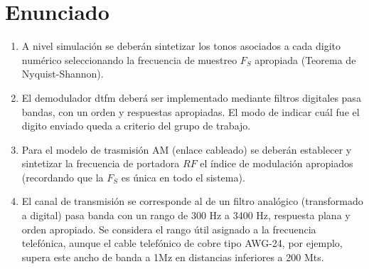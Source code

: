 \section{Enunciado}
\begin{enumerate}[label=\alph*)]
  \item A nivel simulación se deberán sintetizar
        los tonos asociados a cada digito
        numérico seleccionando la frecuencia
        de muestreo $F_S$ apropiada (Teorema de Nyquist-Shannon).
  \item El demodulador \gls{dtfm} deberá ser
        implementado mediante filtros
        digitales pasa bandas, con un
        orden y respuestas apropiadas. El
        modo de indicar cuál fue el digito
        enviado queda a criterio del grupo
        de trabajo.
  \item Para el modelo de trasmisión AM
        (enlace cableado) se deberán
        establecer y sintetizar la frecuencia
        de portadora $RF$ el índice de
        modulación apropiados
        (recordando que la $F_S$ es única en
        todo el sistema).
  \item El canal de transmisión se
        corresponde al de un filtro
        analógico (transformado a digital)
        pasa banda con un rango de 300 Hz
        a 3400 Hz, respuesta plana y orden
        apropiado. Se considera el rango
        útil asignado a la frecuencia
        telefónica, aunque el cable
        telefónico de cobre tipo AWG-24,
        por ejemplo, supera este ancho de
        banda a 1Mz en distancias
        inferiores a 200 Mts.
\end{enumerate}

